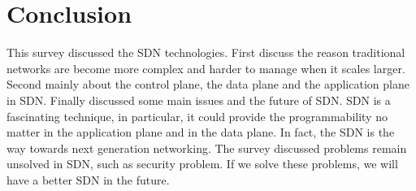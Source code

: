 \documentclass[conference]{IEEEtran}
\begin{document}
%






\section{Conclusion}
This survey discussed the SDN technologies. First discuss the reason traditional networks are become more complex and harder to manage when it scales larger. Second mainly about the control plane, the data plane and the application plane in SDN. Finally discussed some main issues and the future of SDN.
SDN is a fascinating technique, in particular, it could provide the programmability no matter in the application plane and in the data plane. In fact, the SDN is the way towards next generation networking. The survey discussed problems remain unsolved in SDN, such as security problem. If we solve these problems, we will have a better SDN in the future.
\end{document}
